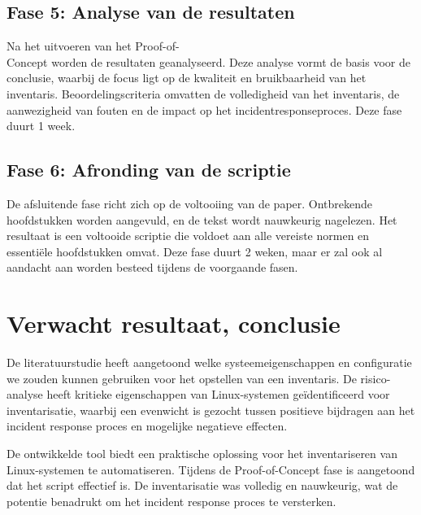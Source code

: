\subsection{Fase 5: Analyse van de resultaten}%
\label{sub:analyse_van_de_resultaten}

Na het uitvoeren van het Proof-of-\\Concept worden de resultaten geanalyseerd.
Deze analyse vormt de basis voor de conclusie, waarbij de focus ligt op de kwaliteit en bruikbaarheid van het inventaris.
Beoordelingscriteria omvatten de volledigheid van het inventaris, de aanwezigheid van fouten en de impact op het incidentresponseproces.
Deze fase duurt 1 week.

\subsection{Fase 6: Afronding van de scriptie}%
\label{sub:afronding_van_de_scriptie}

De afsluitende fase richt zich op de voltooiing van de paper.
Ontbrekende hoofdstukken worden aangevuld, en de tekst wordt nauwkeurig nagelezen.
Het resultaat is een voltooide scriptie die voldoet aan alle vereiste normen en essenti\"ele hoofdstukken omvat.
Deze fase duurt 2 weken, maar er zal ook al aandacht aan worden besteed tijdens de voorgaande fasen.

\section{Verwacht resultaat, conclusie}%
\label{sec:verwachte_resultaten}

De literatuurstudie heeft aangetoond welke systeemeigenschappen en configuratie we zouden kunnen gebruiken voor het opstellen van een inventaris.
De risico-analyse heeft kritieke eigenschappen van Linux-systemen ge\"identificeerd voor inventarisatie, waarbij een evenwicht is gezocht tussen positieve bijdragen aan het incident response proces en mogelijke negatieve effecten.

De ontwikkelde tool biedt een praktische oplossing voor het inventariseren van Linux-systemen te automatiseren.
Tijdens de Proof-of-Concept fase is aangetoond dat het script effectief is.
De inventarisatie was volledig en nauwkeurig, wat de potentie benadrukt om het incident response proces te versterken.

